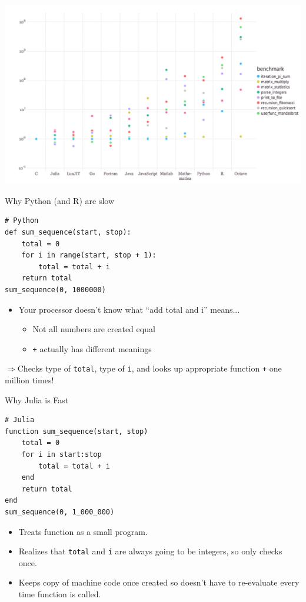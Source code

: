 \documentclass[11pt]{beamer}
\begin{document}
\begin{frame}[c]{}
    \includegraphics[width=1\textwidth]{figures/benchmarks.png}
\end{frame}


\begin{frame}[fragile, t]{Why Python (and R) are slow }
\begin{verbatim}
# Python
def sum_sequence(start, stop):
    total = 0
    for i in range(start, stop + 1):
        total = total + i
    return total
sum_sequence(0, 1000000)
\end{verbatim}
\pause
\begin{itemize}
    \item Your processor doesn't know what ``add total and i'' means...
    \begin{itemize}
        \pause \item Not all numbers are created equal
        \pause \item \texttt{+} actually has different meanings
    \end{itemize}
\end{itemize}
\pause
$\Rightarrow$Checks type of \texttt{total}, type of \texttt{i}, and looks up appropriate function \texttt{+} one million times!
\end{frame}

\begin{frame}[fragile, t]{Why Julia is Fast}
\begin{verbatim}
# Julia
function sum_sequence(start, stop)
    total = 0
    for i in start:stop
        total = total + i
    end
    return total
end
sum_sequence(0, 1_000_000)
    \end{verbatim}
\begin{itemize}
    \pause \item  Treats function as a small program.
    \pause \item Realizes that \texttt{total} and \texttt{i} are always going to be integers, so only checks once.
    \pause \item Keeps copy of machine code once created so doesn't have to re-evaluate every time function is called.
\end{itemize}
\end{frame}
\end{document}

